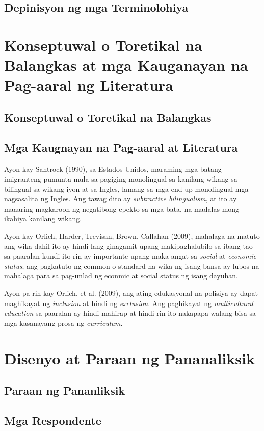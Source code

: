 \documentclass [11pt] {report}
\begin{document}
\section{Depinisyon ng mga Terminolohiya}

\chapter{Konseptuwal o Toretikal na Balangkas at mga Kauganayan na Pag-aaral ng Literatura}
\section {Konseptuwal o Toretikal na Balangkas}
\pagebreak
\section {Mga Kaugnayan na Pag-aaral at Literatura}
Ayon kay Santrock (1990), sa Estados Unidos, maraming mga batang imigranteng
pumunta mula sa pagiging monolingual sa kanilang wikang sa bilingual sa wikang
iyon at sa Ingles, lamang sa mga end up monolingual mga nagsasalita ng Ingles.
Ang tawag dito ay \emph{subtractive bilingualism}, at ito ay maaaring magkaroon
ng negatibong epekto sa mga bata, na madalas mong ikahiya kanilang wikang.

Ayon kay Orlich, Harder, Trevisan, Brown, Callahan (2009), mahalaga na matuto ang
wika dahil ito ay hindi lang ginagamit upang makipaghalubilo sa ibang tao sa
paaralan kundi ito rin ay importante upang maka-angat sa \emph{social} at
\emph{economic status}; ang pagkatuto ng common o standard na wika ng isang
bansa ay lubos na mahalaga para sa pag-unlad ng econmic at social status ng
isang dayuhan.

Ayon pa rin kay Orlich, et al. (2009), ang ating edukasyonal na polisiya ay
dapat maghikayat ng \emph{inclusion} at hindi ng \emph{exclusion}. Ang
paghikayat ng \emph{multicultural education} sa paaralan ay hindi mahirap at
hindi rin ito nakapapa-walang-bisa sa mga kasanayang prosa ng \emph{curriculum}.

\chapter{Disenyo at Paraan ng Pananaliksik}
\section{Paraan ng Pananliksik}
\section{Mga Respondente}
\end{document}
